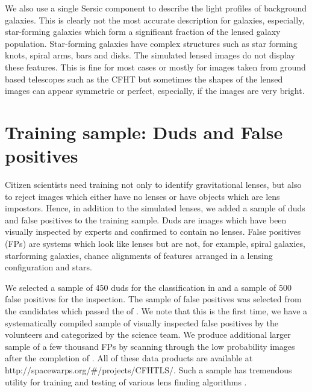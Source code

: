 \documentclass[useAMS,usenatbib,a4paper]{mn2e}
\begin{document}
We also use a single Sersic component to describe the light profiles of
background galaxies. This is clearly not the most accurate description for
galaxies, especially, star-forming galaxies which form a significant fraction
of the lensed galaxy population. Star-forming galaxies have complex structures
such as star forming knots, spiral arms, bars and disks. The simulated lensed
images do not display these features. This is fine for most cases or
mostly for images taken from ground based telescopes such as the CFHT
but sometimes the shapes of the lensed images can appear symmetric or
perfect, especially, if the images are very bright. 


%


\section{Training sample: Duds and False positives}
\label{sec:dfp}

Citizen scientists need training not only to identify gravitational
lenses, but also to reject images which either have no lenses or have
objects which are lens impostors. Hence, in addition to the simulated
lenses, we added a sample of duds and false positives to the training
sample. Duds are images which have been visually inspected by experts
and confirmed to contain no lenses. False positives (FPs) are systems
which look like lenses but are not, for example, spiral galaxies,
starforming galaxies, chance alignments of features arranged in a
lensing configuration and stars.

We selected a sample of 450 duds for the \StageOne classification in \sw
and a sample of 500 false positives for the \StageTwo inspection. The
sample of false positives was selected from the candidates which passed
the \StageOne of \sw. We note that this is the first time, we have a
systematically compiled sample of visually inspected false positives by
the \sw volunteers and categorized by the science team. We produce
additional larger sample of a few thousand FPs by scanning through the
low probability images after the completion of \StageTwo. All of these
data products are available at
http://spacewarps.org/\#/projects/CFHTLS/. Such a sample has tremendous
utility for training and testing of various lens finding algorithms
\citep[e.g.,][]{Chan2014}.
\end{document}
